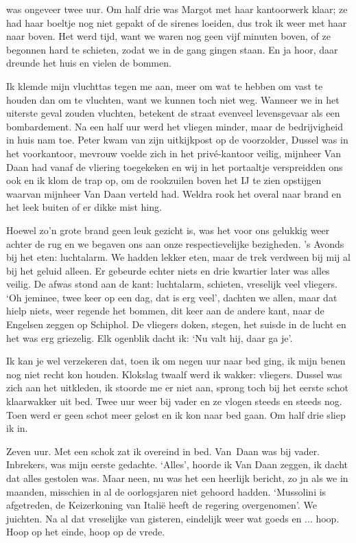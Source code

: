 \documentclass{book}
\begin{document}
was ongeveer twee uur. Om half drie was Margot met haar kantoorwerk
klaar; ze had haar boeltje nog niet gepakt of de sirenes loeiden, dus
trok ik weer met haar naar boven. Het werd tijd, want we waren nog geen
vijf minuten boven, of ze begonnen hard te schieten, zodat we in de gang
gingen staan. En ja hoor, daar dreunde het huis en vielen de bommen.

Ik klemde mijn vluchttas tegen me aan, meer om wat te hebben om vast te
houden dan om te vluchten, want we kunnen toch niet weg. Wanneer we in
het uiterste geval zouden vluchten, betekent de straat evenveel
levensgevaar als een bombardement. Na een half uur werd het vliegen
minder, maar de bedrijvigheid in huis nam toe. Peter kwam van zijn
uitkijkpost op de voorzolder, Dussel was in het voorkantoor, mevrouw
voelde zich in het privé-kantoor veilig, mijnheer Van Daan had vanaf de
vliering toegekeken en wij in het portaaltje verspreidden ons ook en ik
klom de trap op, om de rookzuilen boven het IJ te zien opstijgen waarvan
mijnheer Van Daan verteld had. Weldra rook het overal naar brand en het
leek buiten of er dikke mist hing.

Hoewel zo'n grote brand geen leuk gezicht is, was het voor ons gelukkig
weer achter de rug en we begaven ons aan onze respectievelijke
bezigheden. 's Avonds bij het eten: luchtalarm. We hadden lekker eten,
maar de trek verdween bij mij al bij het geluid alleen. Er gebeurde
echter niets en drie kwartier later was alles veilig. De afwas stond aan
de kant: luchtalarm, schieten, vreselijk veel vliegers. `Oh jeminee,
twee keer op een dag, dat is erg veel', dachten we allen, maar dat hielp
niets, weer regende het bommen, dit keer aan de andere kant, naar de
Engelsen zeggen op Schiphol. De vliegers doken, stegen, het suisde in de
lucht en het was erg griezelig. Elk ogenblik dacht ik: `Nu valt hij,
daar ga je'.

Ik kan je wel verzekeren dat, toen ik om negen uur naar bed ging, ik
mijn benen nog niet recht kon houden. Klokslag twaalf werd ik wakker:
vliegers. Dussel was zich aan het uitkleden, ik stoorde me er niet aan,
sprong toch bij het eerste schot klaarwakker uit bed. Twee uur weer bij
vader en ze vlogen steeds en steeds nog. Toen werd er geen schot meer
gelost en ik kon naar bed gaan. Om half drie sliep ik in.

Zeven uur. Met een schok zat ik overeind in bed. Van~Daan was bij vader.
Inbrekers, was mijn eerste gedachte. `Alles', hoorde ik Van Daan zeggen,
ik dacht dat alles gestolen was. Maar neen, nu was het een heerlijk
bericht, zo jn als we in maanden, misschien in al de oorlogsjaren niet
gehoord hadden. `Mussolini is afgetreden, de Keizerkoning van Italië
heeft de regering overgenomen'. We juichten. Na al dat vreselijke van
gisteren, eindelijk weer wat goeds en ... hoop. Hoop op het einde, hoop
op de vrede.
\end{document}

